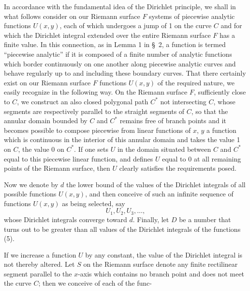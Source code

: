 \documentclass{article}
\begin{document}
In accordance with the fundamental idea of the Dirichlet principle, we shall in what follows consider on our Riemann surface $F$ systems of piecewise analytic functions $U(x, y)$, each of which undergoes a jump of 1 on the curve $C$ and for which the Dirichlet integral extended over the entire Riemann surface $F$ has a finite value. In this connection, as in Lemma 1 in §~2, a function is termed ``piecewise analytic'' if it is composed of a finite number of analytic functions which border continuously on one another along piecewise analytic curves and behave regularly up to and including these boundary curves. That there certainly exist on our Riemann surface $F$ functions $U(x, y)$ of the required nature, we easily recognize in the following way. On the Riemann surface $F$, sufficiently close to $C$, we construct an also closed polygonal path $C^*$ not intersecting $C$, whose segments are respectively parallel to the straight segments of $C$, so that the annular domain bounded by $C$ and $C^*$ remains free of branch points and it becomes possible to compose piecewise from linear functions of $x$, $y$ a function which is continuous in the interior of this annular domain and takes the value 1 on $C$, the value 0 on $C^*$. If one sets $U$ in the domain situated between $C$ and $C^*$ equal to this piecewise linear function, and defines $U$ equal to 0 at all remaining points of the Riemann surface, then $U$ clearly satisfies the requirements posed.

Now we denote by $d$ the lower bound of the values of the Dirichlet integrals of all possible functions $U(x, y)$, and then conceive of such an infinite sequence of functions $U(x, y)$ as being selected, say
\[
U_1, U_2, U_3, \dots, \tag{5}
\]
whose Dirichlet integrals converge toward $d$. Finally, let $D$ be a number that turns out to be greater than all values of the Dirichlet integrals of the functions (5).

If we increase a function $U$ by any constant, the value of the Dirichlet integral is not thereby altered. Let $S$ on the Riemann surface denote any finite rectilinear segment parallel to the $x$-axis which contains no branch point and does not meet the curve $C$; then we conceive of each of the func-
\end{document}
